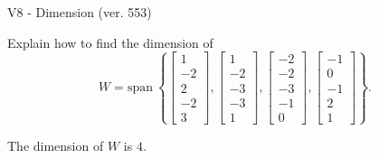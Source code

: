 \begin{exercise}
  \begin{exerciseTitle}V8 - Dimension (ver. 553)\end{exerciseTitle}
  \begin{exerciseStatement}
    Explain how to find the dimension of 
\[W=\mathrm{span}\ \left\{\left[\begin{array}{r}
1 \\
-2 \\
2 \\
-2 \\
3
\end{array}\right] , \left[\begin{array}{r}
1 \\
-2 \\
-3 \\
-3 \\
1
\end{array}\right] , \left[\begin{array}{r}
-2 \\
-2 \\
-3 \\
-1 \\
0
\end{array}\right] , \left[\begin{array}{r}
-1 \\
0 \\
-1 \\
2 \\
1
\end{array}\right]\right\}.\]



  \end{exerciseStatement}
  \begin{exerciseAnswer}
   The dimension of \(W\) is  \(4\).
  


  \end{exerciseAnswer}
\end{exercise}